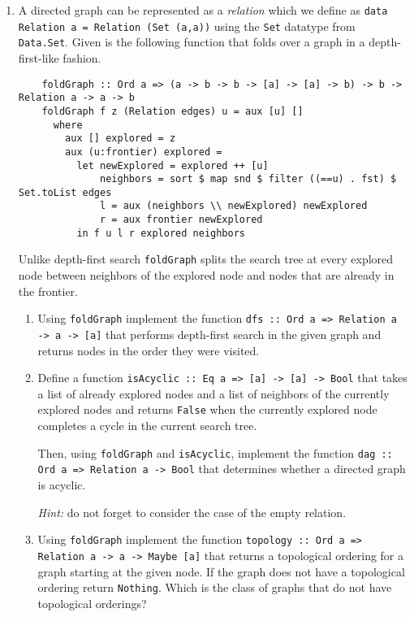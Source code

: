 \documentclass{article}
\def\code#1{\texttt{#1}}
\begin{document}
\begin{enumerate}
    \item A directed graph can be represented as a \textit{relation} which we define as \code{data Relation a = Relation (Set (a,a))} using the \code{Set} datatype from \code{Data.Set}.
        Given is the following function that folds over a graph in a depth-first-like fashion.
        \begin{verbatim}
    foldGraph :: Ord a => (a -> b -> b -> [a] -> [a] -> b) -> b -> Relation a -> a -> b
    foldGraph f z (Relation edges) u = aux [u] []
      where
        aux [] explored = z
        aux (u:frontier) explored =
          let newExplored = explored ++ [u]
              neighbors = sort $ map snd $ filter ((==u) . fst) $ Set.toList edges
              l = aux (neighbors \\ newExplored) newExplored
              r = aux frontier newExplored
          in f u l r explored neighbors
        \end{verbatim}
        Unlike depth-first search \code{foldGraph} splits the search tree at every explored node between neighbors of the explored node and nodes that are already in the frontier.
        \begin{enumerate}
            \item Using \code{foldGraph} implement the function \code{dfs :: Ord a => Relation a -> a -> [a]} that performs depth-first search in the given graph and returns nodes in the order they were visited.
            \item Define a function \code{isAcyclic :: Eq a => [a] -> [a] -> Bool} that takes a list of already explored nodes and a list of neighbors of the currently explored nodes and returns \code{False} when the currently explored node completes a cycle in the current search tree. \par
            Then, using \code{foldGraph} and \code{isAcyclic}, implement the function \code{dag :: Ord a => Relation a -> Bool} that determines whether a directed graph is acyclic. \par
            \textit{Hint:} do not forget to consider the case of the empty relation.
            \item Using \code{foldGraph} implement the function \code{topology :: Ord a => Relation a -> a -> Maybe [a]} that returns a topological ordering for a graph starting at the given node. If the graph does not have a topological ordering return \code{Nothing}. Which is the class of graphs that do not have topological orderings?
        \end{enumerate}


\end{enumerate}
\end{document}
